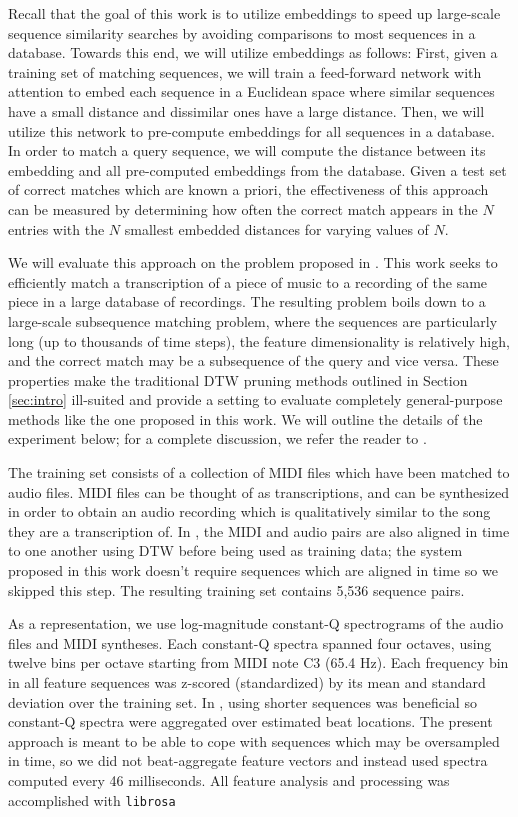 \documentclass{article}
\begin{document}
Recall that the goal of this work is to utilize embeddings to speed up large-scale sequence similarity searches by avoiding comparisons to most sequences in a database.
Towards this end, we will utilize embeddings as follows:
First, given a training set of matching sequences, we will train a feed-forward network with attention to embed each sequence in a Euclidean space where similar sequences have a small distance and dissimilar ones have a large distance.
Then, we will utilize this network to pre-compute embeddings for all sequences in a database.
In order to match a query sequence, we will compute the distance between its embedding and all pre-computed embeddings from the database.
Given a test set of correct matches which are known a priori, the effectiveness of this approach can be measured by determining how often the correct match appears in the $N$ entries with the $N$ smallest embedded distances for varying values of $N$.

We will evaluate this approach on the problem proposed in \cite{raffel2015large}.
This work seeks to efficiently match a transcription of a piece of music to a recording of the same piece in a large database of recordings.
The resulting problem boils down to a large-scale subsequence matching problem, where the sequences are particularly long (up to thousands of time steps), the feature dimensionality is relatively high, and the correct match may be a subsequence of the query and vice versa.
These properties make the traditional DTW pruning methods outlined in Section \ref{sec:intro} ill-suited and provide a setting to evaluate completely general-purpose methods like the one proposed in this work.
We will outline the details of the experiment below; for a complete discussion, we refer the reader to \cite{raffel2015large}.

The training set consists of a collection of MIDI files which have been matched to audio files.
MIDI files can be thought of as transcriptions, and can be synthesized in order to obtain an audio recording which is qualitatively similar to the song they are a transcription of.
In \cite{raffel2015large}, the MIDI and audio pairs are also aligned in time to one another using DTW before being used as training data; the system proposed in this work doesn't require sequences which are aligned in time so we skipped this step.
The resulting training set contains 5,536 sequence pairs.

As a representation, we use log-magnitude constant-Q spectrograms \cite{brown1991calculation} of the audio files and MIDI syntheses.
Each constant-Q spectra spanned four octaves, using twelve bins per octave starting from MIDI note C3 (65.4 Hz).
Each frequency bin in all feature sequences was z-scored (standardized) by its mean and standard deviation over the training set.
In \cite{raffel2015large}, using shorter sequences was beneficial so constant-Q spectra were aggregated over estimated beat locations.
The present approach is meant to be able to cope with sequences which may be oversampled in time, so we did not beat-aggregate feature vectors and instead used spectra computed every 46 milliseconds.
All feature analysis and processing was accomplished with \texttt{librosa} \cite{mcfee2015librosa, mcfee2015librosa_scipy}
\end{document}

